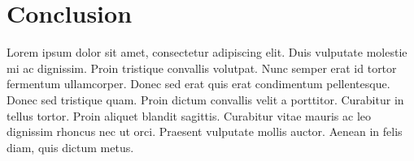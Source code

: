\documentclass[11pt]{article}
\begin{document}
\section{Conclusion}
Lorem ipsum dolor sit amet, consectetur adipiscing elit. Duis vulputate molestie mi ac dignissim. Proin tristique convallis volutpat. Nunc semper erat id tortor fermentum ullamcorper. Donec sed erat quis erat condimentum pellentesque. Donec sed tristique quam. Proin dictum convallis velit a porttitor. Curabitur in tellus tortor. Proin aliquet blandit sagittis. Curabitur vitae mauris ac leo dignissim rhoncus nec ut orci. Praesent vulputate mollis auctor. Aenean in felis diam, quis dictum metus.
\end{document}
